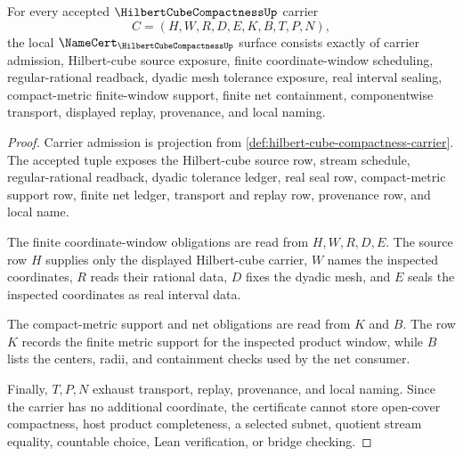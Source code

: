 \begin{theorem}
\label{thm:hilbert-cube-compactness-namecert-obligations}
For every accepted $\HilbertCubeCompactnessUp$ carrier
$$
C=(H,W,R,D,E,K,B,T,P,N),
$$
the local $\NameCert_{\HilbertCubeCompactnessUp}$ surface consists exactly of carrier admission, Hilbert-cube source exposure, finite coordinate-window scheduling, regular-rational readback, dyadic mesh tolerance exposure, real interval sealing, compact-metric finite-window support, finite net containment, componentwise transport, displayed replay, provenance, and local naming.
\end{theorem}
\begin{proof}
Carrier admission is projection from \autoref{def:hilbert-cube-compactness-carrier}. The accepted tuple exposes the Hilbert-cube source row, stream schedule, regular-rational readback, dyadic tolerance ledger, real seal row, compact-metric support row, finite net ledger, transport and replay row, provenance row, and local name.

The finite coordinate-window obligations are read from $H,W,R,D,E$. The source row $H$ supplies only the displayed Hilbert-cube carrier, $W$ names the inspected coordinates, $R$ reads their rational data, $D$ fixes the dyadic mesh, and $E$ seals the inspected coordinates as real interval data.

The compact-metric support and net obligations are read from $K$ and $B$. The row $K$ records the finite metric support for the inspected product window, while $B$ lists the centers, radii, and containment checks used by the net consumer.

Finally, $T,P,N$ exhaust transport, replay, provenance, and local naming. Since the carrier has no additional coordinate, the certificate cannot store open-cover compactness, host product completeness, a selected subnet, quotient stream equality, countable choice, Lean verification, or bridge checking.
\end{proof}

